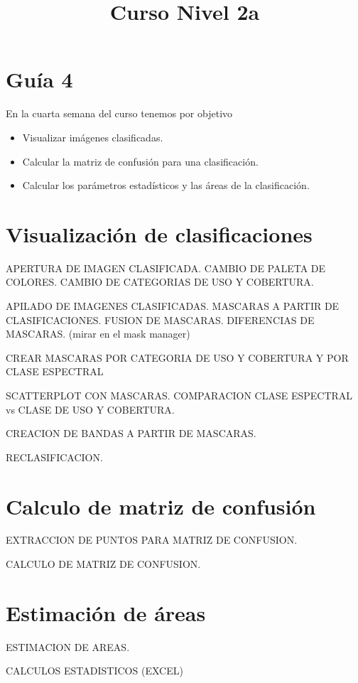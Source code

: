 \documentclass[a4paper]{article}
\title{Curso Nivel 2a}
\begin{document}
\section{Guía 4}
En la cuarta semana del curso tenemos por objetivo
\begin{itemize}
    \item Visualizar imágenes clasificadas.
    \item Calcular la matriz de confusión para una clasificación.
    \item Calcular los parámetros estadísticos y las áreas de la clasificación.
\end{itemize}

\section{Visualización de clasificaciones}

APERTURA DE IMAGEN CLASIFICADA. CAMBIO DE PALETA DE COLORES. CAMBIO DE CATEGORIAS DE USO Y COBERTURA.

APILADO DE IMAGENES CLASIFICADAS. MASCARAS A PARTIR DE CLASIFICACIONES. FUSION DE MASCARAS. DIFERENCIAS DE MASCARAS. (mirar en el mask manager)

CREAR MASCARAS POR CATEGORIA DE USO Y COBERTURA Y POR CLASE ESPECTRAL

SCATTERPLOT CON MASCARAS. COMPARACION CLASE ESPECTRAL vs CLASE DE USO Y COBERTURA.

CREACION DE BANDAS A PARTIR DE MASCARAS.

RECLASIFICACION.

\section{Calculo de matriz de confusión}

EXTRACCION DE PUNTOS PARA MATRIZ DE CONFUSION.

CALCULO DE MATRIZ DE CONFUSION.

\section{Estimación de áreas}

ESTIMACION DE AREAS.

CALCULOS ESTADISTICOS (EXCEL)
\end{document}
